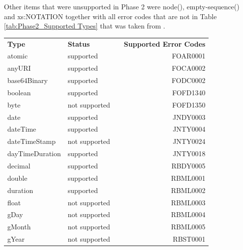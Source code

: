 Other items that were unsupported in Phase 2 were node(), empty-sequence() and xs:NOTATION together with all error codes that are not in Table \ref{tab:Phase2_Supported Types} that was taken from \cite{RumbleSupportedErrorCodes}.

\begin{table}[]
	\begin{tabular}{lllr}
		\textbf{Type}      & \textbf{Status} &  & \multicolumn{1}{c}{\textbf{Supported Error Codes}} \\
		atomic             & supported       &  & FOAR0001                                           \\
		anyURI             & supported       &  & FOCA0002                                           \\
		base64Binary       & supported       &  & FODC0002                                           \\
		boolean            & supported       &  & FOFD1340                                           \\
		byte               & not supported   &  & FOFD1350                                           \\
		date               & supported       &  & JNDY0003                                           \\
		dateTime           & supported       &  & JNTY0004                                           \\
		dateTimeStamp      & not supported   &  & JNTY0024                                           \\
		dayTimeDuration    & supported       &  & JNTY0018                                           \\
		decimal            & supported       &  & RBDY0005                                           \\
		double             & supported       &  & RBML0001                                           \\
		duration           & supported       &  & RBML0002                                           \\
		float              & not supported   &  & RBML0003                                           \\
		gDay               & not supported   &  & RBML0004                                           \\
		gMonth             & not supported   &  & RBML0005                                           \\
		gYear              & not supported   &  & RBST0001                                           \\

\end{tabular}
\end{table}
